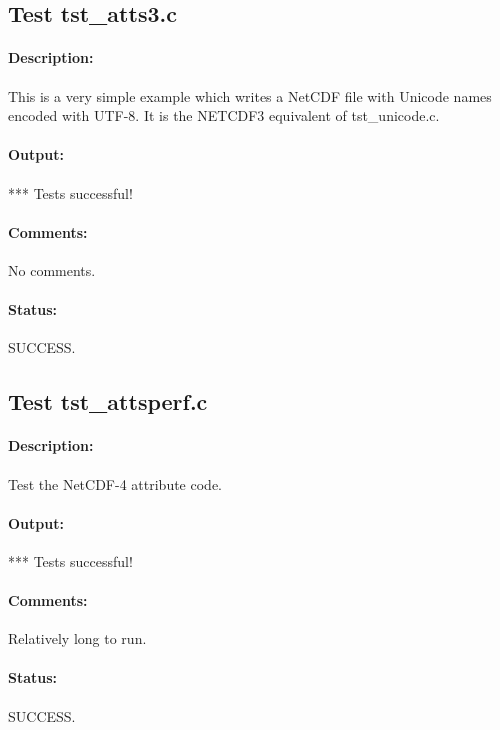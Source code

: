 \subsection{Test tst\_atts3.c}

\paragraph{Description:} This is a very simple example which writes a NetCDF file with Unicode names encoded with UTF-8.
It is the NETCDF3 equivalent of tst\_unicode.c.

\paragraph{Output:} *** Tests successful!

\paragraph{Comments:} No comments.

\paragraph{Status:} SUCCESS.

\subsection{Test tst\_attsperf.c}

\paragraph{Description:} Test the NetCDF-4 attribute code.

\paragraph{Output:} *** Tests successful!

\paragraph{Comments:} Relatively long to run.

\paragraph{Status:} SUCCESS.



